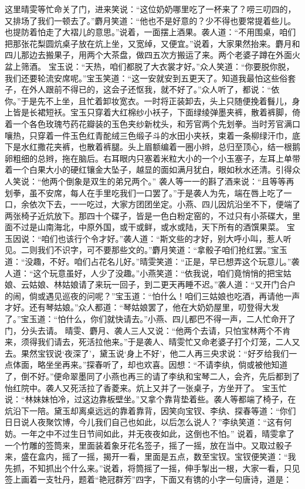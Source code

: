 \documentclass[12pt,oneside]{book}
\begin{document}
这里晴雯等忙命关了门，进来笑说：“这位奶奶哪里吃了一杯来了？唠三叨四的，又排场了我们一顿去了。”麝月笑道：“他也不是好意的？少不得也要常提着些儿。也提防着怕走了大褶儿的意思。”说着，一面摆上酒果。袭人道：“不用围桌，咱们把那张花梨圆炕桌子放在炕上坐，又宽绰，又便宜。”说着，大家果然抬来。麝月和四儿那边去搬果子，用两个大茶盘，做四五次方搬运了来。两个老婆子蹲在外面火盆上筛酒。
宝玉说：“天热，咱们都脱了大衣裳才好。”众人笑道：“你要脱你脱，我们还要轮流安席呢。”宝玉笑道：“这一安就安到五更天了。知道我最怕这些俗套子，在外人跟前不得已的，这会子还怄我，就不好了。”众人听了，都说：“依你。”于是先不上坐，且忙着卸妆宽衣。一时将正装卸去，头上只随便挽着䰖儿，身上皆是长裙短袄。宝玉只穿着大红棉纱小袄子，下面绿绫弹墨夹裤，散着裤脚，倚着一个各色玫瑰芍药花瓣装的玉色夹纱新枕头，和芳官两个先划拳。当时芳官满口嚷热，只穿着一件玉色红青酡绒三色缎子斗的水田小夹袄，束着一条柳绿汗巾，底下是水红撒花夹裤，也散着裤腿。头上眉额编着一圈小辫，总归至顶心，结一根鹅卵粗细的总辫，拖在脑后。右耳眼内只塞着米粒大小的一个小玉塞子，左耳上单带着一个白果大小的硬红镶金大坠子，越显的面如满月犹白，眼如秋水还清。引得众人笑说：“他两个倒象是双生的弟兄两个。”
袭人等一一的斟了酒来说：“且等等再划拳，虽不安席，每人在手里吃我们一口罢了。”于是袭人为先，端在唇上吃了一口，余依次下去，一一吃过，大家方团团坐定。小燕、四儿因炕沿坐不下，便端了两张椅子近炕放下。那四十个碟子，皆是一色白粉定窑的，不过只有小茶碟大，里面不过是山南海北，中原外国，或干或鲜，或水或陆，天下所有的酒馔果菜。
宝玉因说：“咱们也该行个令才好。”袭人道：“斯文些的才好，别大呼小叫，惹人听见。二则我们不识字，可不要那些文的。”麝月笑道：“拿骰子咱们抢红罢。”宝玉道：“没趣，不好。咱们占花名儿好。”晴雯笑道：“正是，早已想弄这个玩意儿。”袭人道：“这个玩意虽好，人少了没趣。”小燕笑道：“依我说，咱们竟悄悄的把宝姑娘、云姑娘、林姑娘请了来玩一回子，到二更天再睡不迟。”袭人道：“又开门合户的闹，倘或遇见巡夜的问呢？”宝玉道：“怕什么！咱们三姑娘也吃酒，再请他一声才好。还有琴姑娘。”众人都道：“琴姑娘罢了，他在大奶奶屋里，叨登得大发了。”宝玉道：“怕什么，你们就快请去。”小燕、四儿都巴不得一声，二人忙命开了门，分头去请。
晴雯、麝月、袭人三人又说：“他两个去请，只怕宝林两个不肯来，须得我们请去，死活拉他来。”于是袭人、晴雯忙又命老婆子打个灯笼，二人又去。果然宝钗说‘夜深了’，黛玉说‘身上不好’，他二人再三央求说：“好歹给我们一点体面，略坐坐再来。”探春听了，却也欢喜。因想：“不请李纨，倘或被他知道了，倒不好。”便命翠墨同了小燕也再三的请了李纨和宝琴二人，会齐，先后都到了怡红院中。袭人又死活拉了香菱来。炕上又并了一张桌子，方坐开了。
宝玉忙说：“林妹妹怕冷，过这边靠板壁坐。”又拿个靠背垫着些。袭人等都端了椅子，在炕沿下一陪。黛玉却离桌远远的靠着靠背，因笑向宝钗、李纨、探春等道：“你们日日说人夜聚饮博，今儿我们自己也如此，以后怎么说人？”李纨笑道：“这有何妨。一年之中不过生日节间如此，并无夜夜如此，这倒也不怕。”
说着，晴雯拿了一个竹雕的签筒来，里面装着象牙花名签子，摇了一摇，放在当中。又取过骰子来，盛在盒内，摇了一摇，揭开一看，里面是五点，数至宝钗。宝钗便笑道：“我先抓，不知抓出个什么来。”说着，将筒摇了一摇，伸手掣出一根，大家一看，只见签上画着一支牡丹，题着“艳冠群芳”四字，下面又有镌的小字一句唐诗，道是：
\end{document}
